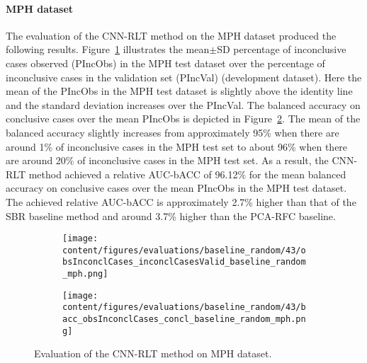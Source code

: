 \paragraph{MPH dataset}

The evaluation of the CNN-RLT method on the MPH dataset produced the following results.
Figure~\ref{fig:obsInconclCases_inconclCasesValid_baseline_random_mph} illustrates
the mean$\pm$SD percentage of inconclusive cases observed (PIncObs) in the MPH test dataset 
over the percentage of inconclusive cases in the validation set (PIncVal) (development dataset).
Here the mean of the PIncObs in the MPH test dataset is slightly above the identity line 
and the standard deviation increases over the PIncVal.
The balanced accuracy on conclusive cases over the mean PIncObs is depicted 
in Figure~\ref{fig:bacc_obsInconclCases_concl_baseline_random_mph}.
The mean of the balanced accuracy slightly increases from approximately 95\% 
when there are around 1\% of inconclusive cases in the MPH test set to about 96\% 
when there are around 20\% of inconclusive cases in the MPH test set.
As a result, the CNN-RLT method achieved a relative AUC-bACC of 96.12\% for the mean balanced accuracy on conclusive cases 
over the mean PIncObs in the MPH test dataset.
The achieved relative AUC-bACC is approximately 2.7\% higher than that of the SBR baseline method 
and around 3.7\% higher than the PCA-RFC baseline.


\begin{figure}[ht]
  \begin{subfigure}{0.49\textwidth}
    \centering
    \texttt{[image: content/figures/evaluations/baseline\_random/43/obsInconclCases\_inconclCasesValid\_baseline\_random\_mph.png]}
    \label{fig:obsInconclCases_inconclCasesValid_baseline_random_mph}
  \end{subfigure}
  \hfill
  \begin{subfigure}{0.49\textwidth}
    \centering
    \texttt{[image: content/figures/evaluations/baseline\_random/43/bacc\_obsInconclCases\_concl\_baseline\_random\_mph.png]}
    \label{fig:bacc_obsInconclCases_concl_baseline_random_mph}
  \end{subfigure}
  \caption{Evaluation of the CNN-RLT method on MPH dataset.}
  \label{fig:perf_eval_rlt_mph}
\end{figure}


